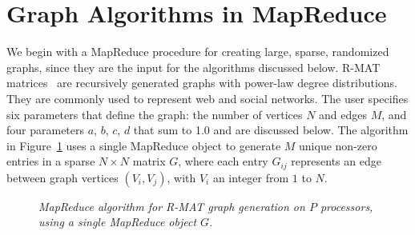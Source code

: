 \section{Graph Algorithms in MapReduce}
\label{sec:graph}

We begin with a MapReduce procedure for creating large, sparse,
randomized graphs, since they are the input for the algorithms
discussed below.  R-MAT matrices~\cite{RMAT} are recursively
generated graphs with power-law degree distributions.  They are
commonly used to represent web and social networks.  The user
specifies six parameters that define the graph: the number of
vertices $N$ and edges $M$, and four parameters $a$, $b$, $c$, $d$
that sum to 1.0 and are discussed below.  The algorithm in
Figure~\ref{fig:rmat} uses a single MapReduce object to generate $M$
unique non-zero entries in a sparse $N \times N$ matrix $G$, where
each entry $G_{ij}$ represents an edge between graph vertices
$(V_i,V_j)$, with $V_i$ an integer from $1$ to $N$.

\begin{figure}[htb]
 \begin{center}\end{center}


 \caption{\it MapReduce algorithm for R-MAT graph generation on $P$
 processors, using a single MapReduce object $G$.}

 \label{fig:rmat}
\end{figure}

